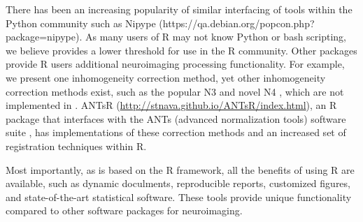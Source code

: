 There has been an increasing popularity of similar interfacing of tools within the Python community such as Nipype \citep{gorgolewski_nipype:_2011} (https://qa.debian.org/popcon.php?package=nipype).  As many users of R may not know Python or bash scripting, we believe  provides a lower threshold for use in the R community.  Other packages provide R users additional neuroimaging processing functionality.   For example, we present one inhomogeneity correction method, yet other inhomogeneity correction methods exist, such as the popular N3 \citep{sled_nonparametric_1998} and novel N4 \citep{tustison_n4itk:_2010}, which are not implemented in .  ANTsR (\url{http://stnava.github.io/ANTsR/index.html}), an R package that interfaces with the ANTs (advanced normalization tools) software suite \citep{avants_reproducible_2011}, has implementations of these correction methods and an increased set of registration techniques within R.

Most importantly, as  is based on the R framework, all the benefits of using R are available, such as dynamic doculments, reproducible reports, customized figures, and state-of-the-art statistical software.  These tools provide unique functionality compared to other software packages for neuroimaging.  


%







